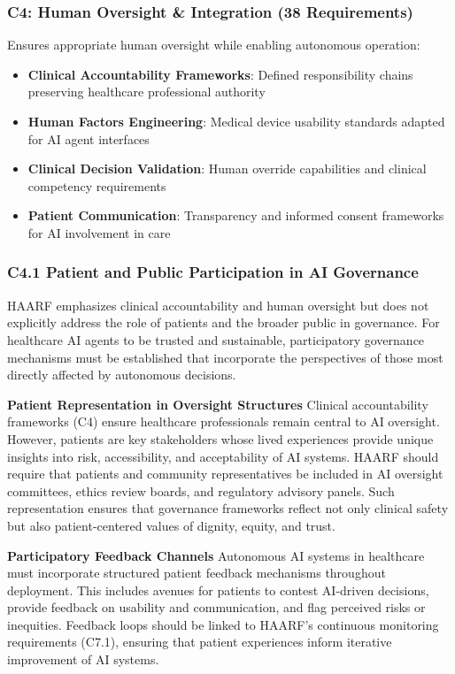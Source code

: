 \documentclass[11pt]{article}
\begin{document}
\subsubsection{C4: Human Oversight \& Integration (38 Requirements)}

Ensures appropriate human oversight while enabling autonomous operation:

\begin{itemize}
    \item \textbf{Clinical Accountability Frameworks}: Defined responsibility chains preserving healthcare professional authority
    \item \textbf{Human Factors Engineering}: Medical device usability standards adapted for AI agent interfaces
    \item \textbf{Clinical Decision Validation}: Human override capabilities and clinical competency requirements
    \item \textbf{Patient Communication}: Transparency and informed consent frameworks for AI involvement in care
\end{itemize}

\subsubsection{C4.1 Patient and Public Participation in AI Governance}

HAARF emphasizes clinical accountability and human oversight but does not explicitly address the role of patients and the broader public in governance. For healthcare AI agents to be trusted and sustainable, participatory governance mechanisms must be established that incorporate the perspectives of those most directly affected by autonomous decisions.

\textbf{Patient Representation in Oversight Structures}  
Clinical accountability frameworks (C4) ensure healthcare professionals remain central to AI oversight. However, patients are key stakeholders whose lived experiences provide unique insights into risk, accessibility, and acceptability of AI systems. HAARF should require that patients and community representatives be included in AI oversight committees, ethics review boards, and regulatory advisory panels. Such representation ensures that governance frameworks reflect not only clinical safety but also patient-centered values of dignity, equity, and trust.

\textbf{Participatory Feedback Channels}  
Autonomous AI systems in healthcare must incorporate structured patient feedback mechanisms throughout deployment. This includes avenues for patients to contest AI-driven decisions, provide feedback on usability and communication, and flag perceived risks or inequities. Feedback loops should be linked to HAARF’s continuous monitoring requirements (C7.1), ensuring that patient experiences inform iterative improvement of AI systems.
\end{document}
